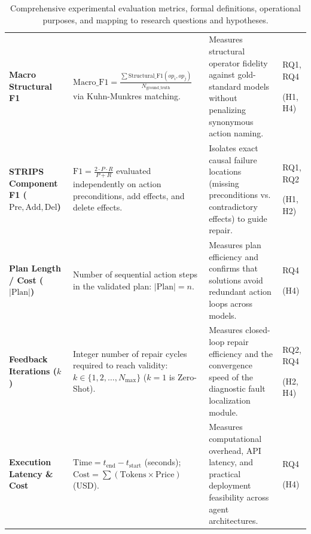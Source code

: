 \documentclass[11pt,a4paper]{article}
\begin{document}
\begin{table}[H]
\begin{tabularx}{\textwidth}{
  >{\raggedright\arraybackslash}p{2.6cm}
  >{\raggedright\arraybackslash}X
  >{\raggedright\arraybackslash}X
  >{\centering\arraybackslash}p{2.0cm}
}
\textbf{Macro Structural F1} & 
$\text{Macro\_F1} = \frac{\sum \text{Structural\_F1}(op_i, op_j)}{N_{\text{ground\_truth}}}$ via Kuhn-Munkres matching. & 
Measures structural operator fidelity against gold-standard models without penalizing synonymous action naming. & 
RQ1, RQ4 \par (H1, H4) \\

\textbf{STRIPS Component F1 ($\text{Pre}, \text{Add}, \text{Del}$)} & 
$\text{F1} = \frac{2 \cdot P \cdot R}{P + R}$ evaluated independently on action preconditions, add effects, and delete effects. & 
Isolates exact causal failure locations (missing preconditions vs. contradictory effects) to guide repair. & 
RQ1, RQ2 \par (H1, H2) \\

\textbf{Plan Length / Cost ($|\text{Plan}|$)} & 
Number of sequential action steps in the validated plan: $|\text{Plan}| = n$. & 
Measures plan efficiency and confirms that solutions avoid redundant action loops across models. & 
RQ4 \par (H4) \\

\textbf{Feedback Iterations ($k$)} & 
Integer number of repair cycles required to reach validity: $k \in \{1, 2, \dots, N_{\max}\}$ ($k = 1$ is Zero-Shot). & 
Measures closed-loop repair efficiency and the convergence speed of the diagnostic fault localization module. & 
RQ2, RQ4 \par (H2, H4) \\

\textbf{Execution Latency \& Cost} & 
$\text{Time} = t_{\text{end}} - t_{\text{start}}$ (seconds); $\text{Cost} = \sum (\text{Tokens} \times \text{Price})$ (USD). & 
Measures computational overhead, API latency, and practical deployment feasibility across agent architectures. & 
RQ4 \par (H4) \\
\bottomrule
\end{tabularx}
\caption{Comprehensive experimental evaluation metrics, formal definitions, operational purposes, and mapping to research questions and hypotheses.}
\label{tab:evaluation_metrics_mapping}
\end{table}
\end{document}
